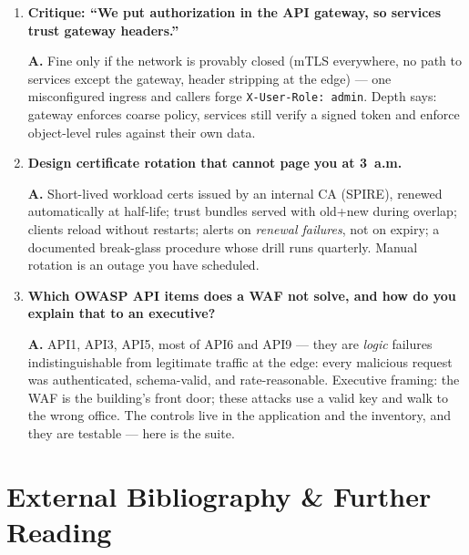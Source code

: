\begin{enumerate}[label=\textbf{Q\arabic*.}, leftmargin=1.7cm, itemsep=0.9em, start=23]
        to every version (Chapter~\ref{ch:versioning},
        Chapter~\ref{ch:lifecycle}), and alert on any traffic to retired
        versions --- nonzero v0 traffic is the smoke alarm.
  \item \textbf{Critique: ``We put authorization in the API gateway, so
        services trust gateway headers.''}\par
        \textbf{A.} Fine only if the network is provably closed (mTLS
        everywhere, no path to services except the gateway, header
        stripping at the edge) --- one misconfigured ingress and callers
        forge \texttt{X-User-Role: admin}. Depth says: gateway enforces
        coarse policy, services still verify a signed token and enforce
        object-level rules against their own data.
  \item \textbf{Design certificate rotation that cannot page you at
        3~a.m.}\par
        \textbf{A.} Short-lived workload certs issued by an internal CA
        (SPIRE), renewed automatically at half-life; trust bundles served
        with old+new during overlap; clients reload without restarts;
        alerts on \emph{renewal failures}, not on expiry; a documented
        break-glass procedure whose drill runs quarterly. Manual rotation
        is an outage you have scheduled.
  \item \textbf{Which OWASP API items does a WAF not solve, and how do you
        explain that to an executive?}\par
        \textbf{A.} API1, API3, API5, most of API6 and API9 --- they are
        \emph{logic} failures indistinguishable from legitimate traffic at
        the edge: every malicious request was authenticated,
        schema-valid, and rate-reasonable. Executive framing: the WAF is
        the building's front door; these attacks use a valid key and walk
        to the wrong office. The controls live in the application and the
        inventory, and they are testable --- here is the suite.
\end{enumerate}

\section{External Bibliography \& Further Reading}
\label{sec:ch16-bibliography}

